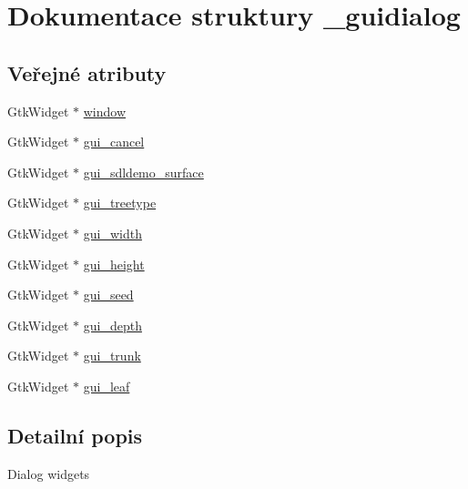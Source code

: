 \hypertarget{struct__guidialog}{
\section{Dokumentace struktury \_\-guidialog}
\label{struct__guidialog}
}
\subsection*{Veřejné atributy}
\begin{DoxyCompactItemize}
\item 
GtkWidget $\ast$ \hyperlink{struct__guidialog_acbf2d8b5cd9ceaaf91b42387cb07fe74}{window}
\item 
GtkWidget $\ast$ \hyperlink{struct__guidialog_aacddf0167ab045db9d05d85052901052}{gui\_\-cancel}
\item 
GtkWidget $\ast$ \hyperlink{struct__guidialog_a129528d8a16803cce010dc3dfab8797a}{gui\_\-sdldemo\_\-surface}
\item 
GtkWidget $\ast$ \hyperlink{struct__guidialog_a48c9ce6f5655422686cd48b8ea56ebcc}{gui\_\-treetype}
\item 
GtkWidget $\ast$ \hyperlink{struct__guidialog_a144fa52345c7e50785032abf90e94e44}{gui\_\-width}
\item 
GtkWidget $\ast$ \hyperlink{struct__guidialog_a576abdf065101bb3af7fd1d045235c7b}{gui\_\-height}
\item 
GtkWidget $\ast$ \hyperlink{struct__guidialog_a3c4e66ea5fc40eb370ec4f0d20e3bb1e}{gui\_\-seed}
\item 
GtkWidget $\ast$ \hyperlink{struct__guidialog_a6e3f4a245029a291984ed008422ccb3e}{gui\_\-depth}
\item 
GtkWidget $\ast$ \hyperlink{struct__guidialog_a2fbdb60bde6048ad17547f30ec8e425e}{gui\_\-trunk}
\item 
GtkWidget $\ast$ \hyperlink{struct__guidialog_a9195a25c2720673c3f19fdf91e79f6a2}{gui\_\-leaf}
\end{DoxyCompactItemize}


\subsection{Detailní popis}
Dialog widgets 

